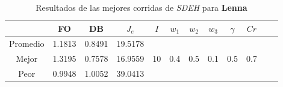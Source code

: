 \begin{table}[h!]
\footnotesize
\begin{center}
\begin{tabular}{|c|c|c|c|c|c|c|c|c|c|c|c|}
\hline
& {\bf FO} & {\bf DB}& $J_e$ & $I$ & $w_1$ & $w_2$ & $w_3$ & $\gamma$ & $Cr$ \\
\hline
\hline
Promedio   & 1.1813 & 0.8491  & 19.5178 &  &  &  &  &  & \\
\cline{1-4}
Mejor & 1.3195 & 0.7578  & 16.9559 & 10 & 0.4 & 0.5 & 0.1 & 0.5 & 0.7\\
\cline{1-4}
Peor & 0.9948 & 1.0052  & 39.0413 &  &  &  &  &  & \\\hline
\end{tabular}
\caption{Resultados de las mejores corridas de \emph{SDEH} para {\bf Lenna}}
\label{tb:pmpsdehibimg}
\end{center}
\end{table}
